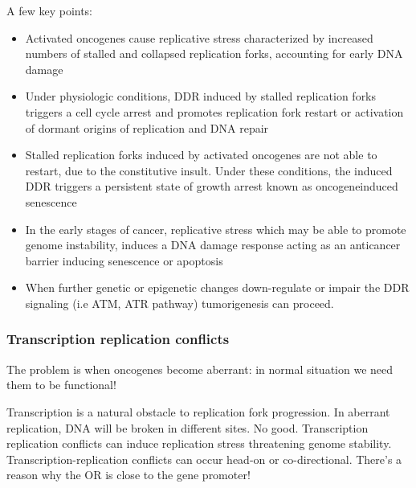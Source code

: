 A few key points: 
\begin{itemize}
\tightlist
\item Activated oncogenes cause replicative stress
characterized by increased numbers of stalled and collapsed replication
forks, accounting for early DNA damage
\item Under physiologic conditions,
DDR induced by stalled replication forks triggers a cell cycle arrest
and promotes replication fork restart or activation of dormant origins
of replication and DNA repair
\item Stalled replication forks induced by
activated oncogenes are not able to restart, due to the constitutive
insult. Under these conditions, the induced DDR triggers a persistent
state of growth arrest known as oncogeneinduced senescence
\item In the
early stages of cancer, replicative stress which may be able to promote
genome instability, induces a DNA damage response acting as an
anticancer barrier inducing senescence or apoptosis
\item When further
genetic or epigenetic changes down-regulate or impair the DDR signaling
(i.e ATM, ATR pathway) tumorigenesis can proceed.
\end{itemize}

\hypertarget{transcription-replication-conflicts}{%
\subsubsection{Transcription replication
conflicts}\label{transcription-replication-conflicts}}

The problem is when oncogenes become aberrant: in normal situation we
need them to be functional!

Transcription is a natural obstacle to replication fork progression. In
aberrant replication, DNA will be broken in different sites. No good.
Transcription replication conflicts can induce replication stress
threatening genome stability. Transcription-replication conflicts can
occur head-on or co-directional. There's a reason why the OR is close to
the gene promoter!

